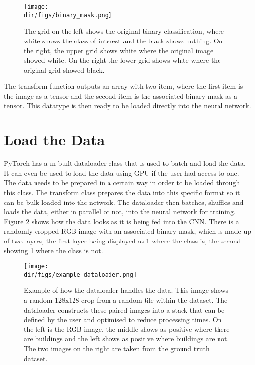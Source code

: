 \begin{figure}[htbp]
    \centering
    \texttt{[image: \\dir/figs/binary\_mask.png]}
    \caption[Binary Mask]{The grid on the left shows the original binary classification, where white shows the class of interest and the black shows nothing. On the right, the upper grid shows white where the original image showed white. On the right the lower grid shows white where the original grid showed black.}
    \label{fig.binary_mask}
\end{figure}
The transform function outputs an array with two item, where the first item is the image as a tensor and the second item is the associated binary mask as a tensor. This datatype is then ready to be loaded directly into the neural network.
\section{Load the Data}
PyTorch has a in-built dataloader class that is used to batch and load the data. It can even be used to load the data using GPU if the user had access to one. The data needs to be prepared in a certain way in order to be loaded through this class. The transform class prepares the data into this specific format so it can be bulk loaded into the network. The dataloader then batches, shuffles and loads the data, either in parallel or not, into the neural network for training. Figure \ref{fig.dataloader} shows how the data looks as it is being fed into the CNN. There is a randomly cropped RGB image with an associated binary mask, which is made up of two layers, the first layer being displayed as 1 where the class is, the second showing 1 where the class is not. 
\begin{figure}[H]
    \centering
    \texttt{[image: \\dir/figs/example\_dataloader.png]}
    \caption[Example of how the dataloader handles the data]{Example of how the dataloader handles the data. This image shows a random 128x128 crop from a random tile within the dataset. The dataloader constructs these paired images into a stack that can be defined by the user and optimised to reduce processing times. On the left is the RGB image, the middle shows as positive where there are buildings and the left shows as positive where buildings are not. The two images on the right are taken from the ground truth dataset.}
    \label{fig.dataloader}
\end{figure}